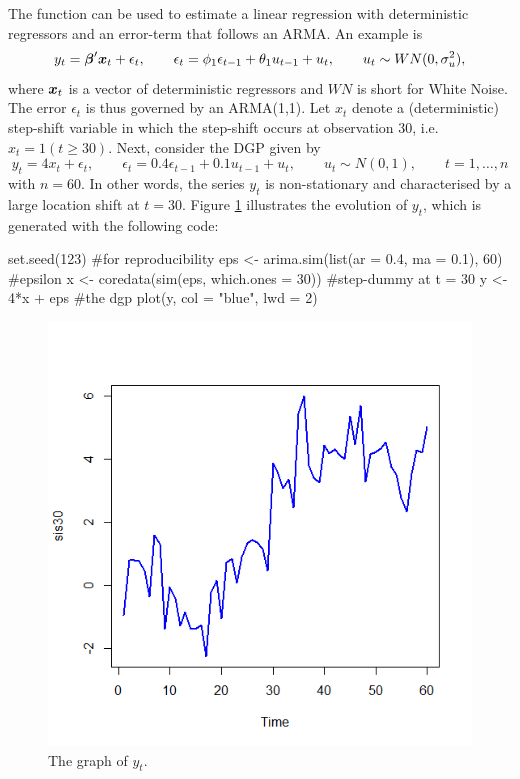 The function  can be used to estimate a linear regression with deterministic regressors and an error-term that follows an ARMA. An example is
%
\begin{equation*}
	y_t = \boldsymbol{\beta}'\boldsymbol{x}_{t} + \epsilon_t, \qquad \epsilon_t = \phi_1\epsilon_{t-1} + \theta_1 u_{t-1} + u_t, \qquad u_t\sim WN(0,\sigma_u^2),
\end{equation*} 
%
where $\boldsymbol{x}_t$ is a vector of deterministic regressors and $WN$ is short for White Noise. The error $\epsilon_t$ is thus governed by an ARMA(1,1). Let $x_t$ denote a (deterministic) step-shift variable in which the step-shift occurs at observation 30, i.e.\ $x_t = 1(t\geq30)$. Next, consider the DGP given by
%
\begin{equation*}
	y_t = 4x_t + \epsilon_t, \qquad \epsilon_t = 0.4\epsilon_{t-1} + 0.1 u_{t-1} + u_t, \qquad u_t \sim N(0,1), \qquad t=1,\ldots,n
\end{equation*}
%
with $n=60$. In other words, the series $y_t$ is non-stationary and characterised by a large location shift at $t=30$. Figure \ref{figure:step-shift} illustrates the evolution of $y_t$, which is generated with the following code:
%
\begin{example}
  set.seed(123) #for reproducibility
  eps <- arima.sim(list(ar = 0.4, ma = 0.1), 60) #epsilon
  x <- coredata(sim(eps, which.ones = 30)) #step-dummy at t = 30
  y <- 4*x + eps #the dgp
  plot(y, col = "blue", lwd = 2)
\end{example}
%
\begin{figure}[htbp]
	\centering
	\includegraphics[scale=0.5]{step-shift}
	\caption{The graph of $y_t$.}
	\label{figure:step-shift}
\end{figure}
